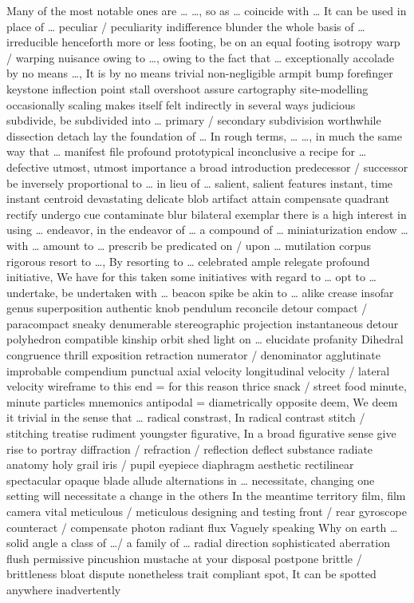 \documentclass[12pt]{article}
\begin{document}
Many of the most notable ones are \dots 
\dots, so as \dots 
coincide with \dots 
It can be used in place of \dots 
peculiar / peculiarity 
indifference 
blunder 
the whole basis of \dots 
irreducible 
henceforth 
more or less 
footing, be on an equal footing 
isotropy 
warp / warping 
nuisance 
owing to \dots, owing to the fact that \dots 
exceptionally 
accolade 
by no means \dots, It is by no means trivial 
non-negligible 
armpit 
bump 
forefinger 
keystone 
inflection point 
stall 
overshoot 
assure 
cartography 
site-modelling 
occasionally 
scaling makes itself felt indirectly in several ways 
judicious 
subdivide, be subdivided into \dots 
primary / secondary 
subdivision 
worthwhile 
dissection 
detach 
lay the foundation of \dots 
In rough terms, \dots 
\dots, in much the same way that \dots 
manifest file 
profound 
prototypical 
inconclusive 
a recipe for \dots 
defective 
utmost, utmost importance 
a broad introduction 
predecessor / successor 
be inversely proportional to \dots 
in lieu of \dots 
salient, salient features 
instant, time instant 
centroid 
devastating 
delicate 
blob 
artifact 
attain 
compensate 
quadrant 
rectify 
undergo 
cue 
contaminate 
blur 
bilateral 
exemplar 
there is a high interest in using \dots 
endeavor, in the endeavor of \dots 
a compound of \dots 
miniaturization 
endow \dots with \dots 
amount to \dots 
prescrib 
be predicated on / upon \dots 
mutilation 
corpus 
rigorous 
resort to \dots, By resorting to \dots 
celebrated 
ample 
relegate 
profound 
initiative, We have for this taken some initiatives with regard to \dots 
opt to \dots 
undertake, be undertaken with \dots 
beacon 
spike 
be akin to \dots 
alike 
crease 
insofar 
genus 
superposition 
authentic 
knob 
pendulum 
reconcile 
detour 
compact / paracompact 
sneaky 
denumerable 
stereographic projection 
instantaneous 
detour 
polyhedron 
compatible 
kinship 
orbit 
shed light on \dots 
elucidate 
profanity 
Dihedral 
congruence 
thrill 
exposition 
retraction 
numerator / denominator 
agglutinate 
improbable 
compendium 
punctual 
axial velocity 
longitudinal velocity / lateral velocity 
wireframe 
to this end = for this reason 
thrice 
snack / street food 
minute, minute particles 
mnemonics 
antipodal = diametrically opposite 
deem, We deem it trivial in the sense that \dots 
radical constrast, In radical contrast 
stitch / stitching 
treatise 
rudiment 
youngster 
figurative, In a broad figurative sense 
give rise to 
portray 
diffraction / refraction / reflection 
deflect 
substance 
radiate 
anatomy 
holy grail 
iris / pupil 
eyepiece 
diaphragm 
aesthetic 
rectilinear 
spectacular 
opaque 
blade 
allude 
alternations in \dots 
necessitate, changing one setting will necessitate a change in the others 
In the meantime 
territory 
film, film camera 
vital 
meticulous / meticulous designing and testing 
front / rear 
gyroscope 
counteract / compensate 
photon 
radiant flux 
Vaguely speaking 
Why on earth \dots 
solid angle 
a class of \dots / a family of \dots 
radial direction 
sophisticated 
aberration 
flush 
permissive 
pincushion 
mustache 
at your disposal 
postpone 
brittle / brittleness 
bloat 
dispute 
nonetheless 
trait 
compliant 
spot, It can be spotted anywhere 
inadvertently 
\end{document}
